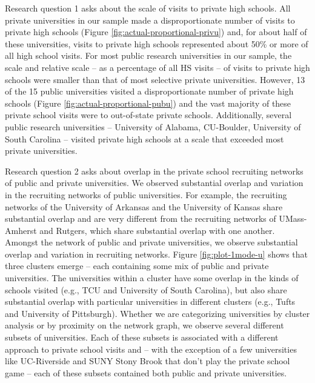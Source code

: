 \documentclass[
  12pt,
]{article}
\begin{document}
Research question 1 asks about the scale of visits to private high schools. All private universities in our sample made a disproportionate number of visits to private high schools (Figure \ref{fig:actual-proportional-privu}) and, for about half of these universities, visits to private high schools represented about 50\% or more of all high school visits. For most public research universities in our sample, the scale and relative scale -- as a percentage of all HS visits -- of visits to private high schools were smaller than that of most selective private universities. However, 13 of the 15 public universities visited a disproportionate number of private high schools (Figure \ref{fig:actual-proportional-pubu}) and the vast majority of these private school visits were to out-of-state private schools. Additionally, several public research universities -- University of Alabama, CU-Boulder, University of South Carolina -- visited private high schools at a scale that exceeded most private universities.

Research question 2 asks about overlap in the private school recruiting networks of public and private universities. We observed substantial overlap and variation in the recruiting networks of public universities. For example, the recruiting networks of the University of Arkansas and the University of Kansas share substantial overlap and are very different from the recruiting networks of UMass-Amherst and Rutgers, which share substantial overlap with one another. Amongst the network of public and private universities, we observe substantial overlap and variation in recruiting networks. Figure \ref{fig:plot-1mode-u} shows that three clusters emerge -- each containing some mix of public and private universities. The universities within a cluster have some overlap in the kinds of schools visited (e.g., TCU and University of South Carolina), but also share substantial overlap with particular universities in different clusters (e.g., Tufts and University of Pittsburgh). Whether we are categorizing universities by cluster analysis or by proximity on the network graph, we observe several different subsets of universities. Each of these subsets is associated with a different approach to private school visits and -- with the exception of a few universities like UC-Riverside and SUNY Stony Brook that don't play the private school game -- each of these subsets contained both public and private universities.
\end{document}
